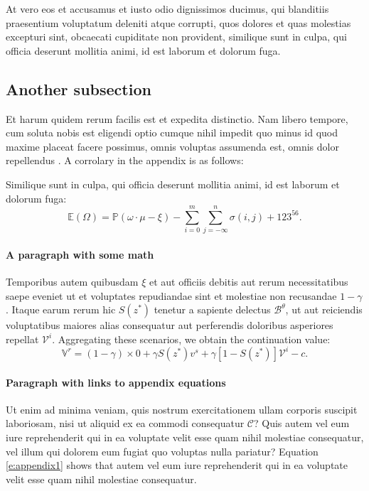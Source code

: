 \documentclass[letterpaper,12pt,leqno]{article}
\begin{document}
At vero eos et accusamus et iusto odio dignissimos ducimus, qui blanditiis praesentium voluptatum deleniti atque corrupti, quos dolores et quas molestias excepturi sint, obcaecati cupiditate non provident, similique sunt in culpa, qui officia deserunt mollitia animi, id est laborum et dolorum fuga. 

\subsection{Another subsection}

 Et harum quidem rerum facilis est et expedita distinctio. Nam libero tempore, cum soluta nobis est eligendi optio cumque nihil impedit quo minus id quod maxime placeat facere possimus, omnis voluptas assumenda est, omnis dolor repellendus \citep{MS22a}. A corrolary in the appendix is as follows:

\begin{corollary} Similique sunt in culpa, qui officia deserunt mollitia animi, id est laborum et dolorum fuga:
\begin{equation*}
\mathbb{E}(\Omega) = \mathbb{P}(\omega\cdot \mu - \xi) - \sum_{i=0}^{m}\sum_{j=-\infty}^{n} \sigma(i,j) + 123^{56}.
\end{equation*}\end{corollary}

\paragraph{A paragraph with some math} Temporibus autem quibusdam $\xi$ et aut officiis debitis aut rerum necessitatibus saepe eveniet ut et voluptates repudiandae sint et molestiae non recusandae $1-\gamma$. Itaque earum rerum hic $S(z^*)$ tenetur a sapiente delectus $\mathcal{B}^\theta$, ut aut reiciendis voluptatibus maiores alias consequatur aut perferendis doloribus asperiores repellat $\mathcal{V}^i$. Aggregating these scenarios, we obtain the continuation value:
\begin{equation}
\mathbb{V}^r = (1-\gamma) \times 0 +\gamma S(z^*) v^s+\gamma [1-S(z^*)] \mathcal{V}^i-c.
\label{e:appendix1}\end{equation}

\paragraph{Paragraph with links to appendix equations} Ut enim ad minima veniam, quis nostrum exercitationem ullam corporis suscipit laboriosam, nisi ut aliquid ex ea commodi consequatur $\mathcal{C}$? Quis autem vel eum iure reprehenderit qui in ea voluptate velit esse quam nihil molestiae consequatur, vel illum qui dolorem eum fugiat quo voluptas nulla pariatur? Equation \eqref{e:appendix1} shows that autem vel eum iure reprehenderit qui in ea voluptate velit esse quam nihil molestiae consequatur.
\end{document}
